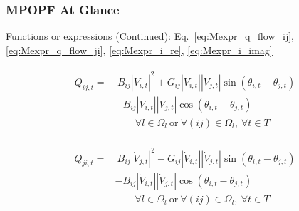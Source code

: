 \documentclass[
	11pt, %
	aspectratio=169, %
]{beamer}
\begin{document}
\begin{frame}
	\frametitle{MPOPF At Glance}
	
	Functions or expressions (Continued): Eq.~\eqref{eq:Mexpr_q_flow_ij},\eqref{eq:Mexpr_q_flow_ji}, \eqref{eq:Mexpr_i_re}, \eqref{eq:Mexpr_i_imag}
	
	\begin{align*}
		\begin{split}
			Q_{ij,t} =&\ B_{ij}\left\lvert \dot{V}_{i,t}\right\rvert^{2} + G_{ij}\left\lvert \dot{V}_{i,t}\right\rvert\left\lvert \dot{V}_{j,t}\right\rvert \sin{\left(\theta_{i,t}-\theta_{j,t}\right)} \\
			&- B_{ij}\left\lvert \dot{V}_{i,t}\right\rvert\left\lvert \dot{V}_{j,t}\right\rvert \cos{\left(\theta_{i,t}-\theta_{j,t}\right)}  \\
			&\qquad \forall l \in \Omega_{l} \ \text{or} \ \forall (ij) \in \Omega_{l},\ \forall t \in T
		\end{split}
	\end{align*}

	\begin{align*}
		\begin{split}
			Q_{ji,t} =&\ B_{ij}\left\lvert \dot{V}_{j,t}\right\rvert^{2} - G_{ij}\left\lvert \dot{V}_{i,t}\right\rvert\left\lvert \dot{V}_{j,t}\right\rvert \sin{\left(\theta_{i,t}-\theta_{j,t}\right)} \\
			&- B_{ij}\left\lvert \dot{V}_{i,t}\right\rvert\left\lvert \dot{V}_{j,t}\right\rvert \cos{\left(\theta_{i,t}-\theta_{j,t}\right)}  \\
			&\qquad \forall l \in \Omega_{l} \ \text{or} \ \forall (ij) \in \Omega_{l},\ \forall t \in T
		\end{split}
	\end{align*}
	

\end{frame}


\end{document}
